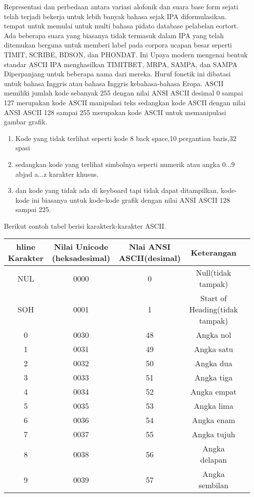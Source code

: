 	Representasi dan perbedaan antara variasi alofonik dan suara base form sejati telah terjadi
	bekerja untuk lebih banyak bahasa sejak IPA diformulasikan. 
	tempat untuk memulai untuk multi bahasa pidato database pelabelan eortort.
	Ada beberapa suara yang biasanya tidak termasuk dalam IPA yang telah ditemukan
	berguna untuk memberi label pada corpora ucapan besar seperti TIMIT, SCRIBE, BDSON, dan PHONDAT. Ini
	Upaya modern mengenai bentuk standar ASCII IPA menghasilkan TIMITBET, MRPA, SAMPA, dan
	SAMPA Diperpanjang untuk beberapa nama dari mereka. Huruf fonetik ini dibatasi untuk bahasa Inggris atau bahasa Inggris kebahasa-bahasa Eropa.
	ASCII memiliki jumlah kode sebanyak 255 dengan nilai ANSI ASCII desimal 0 sampai 127 merupakan kode ASCII manipulasi teks sedangkan kode ASCII dengan nilai ANSI ASCII 128 sampai 255 merupakan kode ASCII untuk memanipulasi gambar grafik.
	\begin{enumerate}
		\item Kode yang tidak terlihat seperti kode 8 back space,10 pergantian baris,32 spasi 
		\item sedangkan kode yang terlihat simbolnya seperti numerik atau angka 0...9 abjad a...z karakter khusus.
		\item dan kode yang tidak ada di keyboard tapi tidak dapat ditampilkan, kode-kode ini biasanya untuk kode-kode grafik dengan nilai ANSI ASCII 128 sampai 225.
  \end{enumerate}

	Berikut contoh tabel berisi karakterk-karakter ASCII.
\begin{table}[H]
\begin{tabular}{|c|c|c|c|c|}
hline
Karakter & Nilai Unicode (heksadesimal) & Nlai ANSI ASCII(desimal) & Keterangan\\
\hline
NUL & 0000 & 0 & Null(tidak tampak)\\
SOH & 0001 & 1 & Start of Heading(tidak tampak)\\
0 & 0030 & 48 & Angka nol\\
1 & 0031 & 49 & Angka satu\\
2 & 0032 & 50 & Angka dua\\
3 & 0033 & 51 & Angka tiga\\
4 & 0034 & 52 & Angka empat\\
5 & 0035 & 53 & Angka lima\\
6 & 0036 & 54 & Angka enam\\
7 & 0037 & 55 & Angka tujuh\\
8 & 0038 & 56 & Angka delapan\\
9 & 0039 & 57 & Angka sembilan\\
\hline
\end{tabular}
\end{table}


